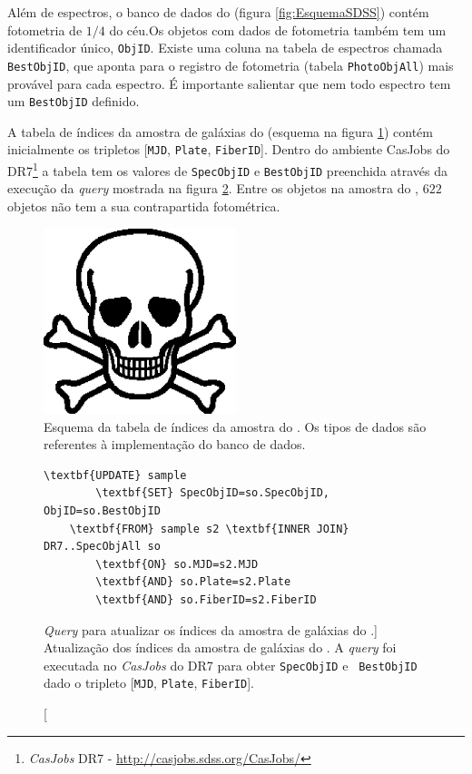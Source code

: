 Além de espectros, o banco de dados do \SDSS (figura \ref{fig:EsquemaSDSS})
contém fotometria de $1/4$ do céu.\citneed Os objetos com dados de fotometria
também tem um identificador único, {\tt ObjID}. Existe uma coluna na tabela de
espectros chamada {\tt BestObjID}, que aponta para o registro de fotometria
(tabela {\tt PhotoObjAll}) mais provável para cada espectro. É importante
salientar que nem todo espectro tem um {\tt BestObjID} definido.

A tabela de índices da amostra de galáxias do \starlight (esquema na figura
\ref{fig:TabelaAmostraStarlight}) contém inicialmente os tripletos [{\tt MJD},
{\tt Plate}, {\tt FiberID}]. Dentro do ambiente {CasJobs} do \SDSS
DR7\footnote{{\em CasJobs} \SDSS DR7 - \url{http://casjobs.sdss.org/CasJobs/}} a
tabela tem os valores de {\tt SpecObjID} e {\tt BestObjID} preenchida através da
execução da {\em query} mostrada na figura \ref{fig:AtualizaObjIds}. Entre os
objetos na amostra do \starlight, $622$ objetos não tem a sua contrapartida
fotométrica.

\begin{figure}
	\includegraphics[width=0.5\textwidth]{figuras/test.eps}
	\caption[Esquema da tabela de índices da amostra do \starlight.]
	{Esquema da tabela de índices da amostra do \starlight. Os tipos de dados são
	referentes à implementação do banco de dados.}
	\label{fig:TabelaAmostraStarlight}
\end{figure}

\begin{figure}
	\begin{Verbatim}[commandchars=\\\{\}]
	\textbf{UPDATE} sample
		\textbf{SET} SpecObjID=so.SpecObjID, ObjID=so.BestObjID
	\textbf{FROM} sample s2 \textbf{INNER JOIN} DR7..SpecObjAll so
		\textbf{ON} so.MJD=s2.MJD
		\textbf{AND} so.Plate=s2.Plate
		\textbf{AND} so.FiberID=s2.FiberID
	\end{Verbatim}
	\caption
	[{\em Query} para atualizar os índices da amostra de galáxias do
	\starlight.]
	{Atualização dos índices da amostra de galáxias do \starlight. A {\em query}
	foi executada no {\em CasJobs} do \SDSS DR7 para obter {\tt SpecObjID} e {\tt
	BestObjID} dado o tripleto [{\tt MJD}, {\tt Plate}, {\tt FiberID}].}
	\label{fig:AtualizaObjIds}
\end{figure}


